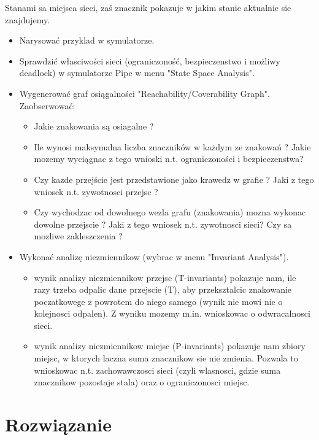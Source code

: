 \documentclass[12pt]{article}
\begin{document}
Stanami sa miejsca sieci, zaś znacznik pokazuje w jakim stanie aktualnie sie znajdujemy.

\begin{itemize}
    \item Narysować przyklad w symulatorze.
    \item Sprawdzić własciwości sieci (ograniczoność, bezpieczenstwo i możliwy deadlock) w symulatorze Pipe w menu "State Space Analysis".

    \item Wygenerować graf osiągalności "Reachability/Coverability Graph". Zaobserwować: 
    \begin{itemize}[label=$-$]
        \item Jakie znakowania są osiagalne ?
        \item Ile wynosi maksymalna liczba znaczników w każdym ze znakowań ? Jakie mozemy wyciągnac z tego wnioski n.t. ograniczoności i bezpieczenstwa?
        \item Czy kazde przejście jest przedstawione jako krawedz w grafie ? Jaki z tego wniosek n.t. zywotnosci przejsc ?
        \item Czy wychodzac od dowolnego wezla grafu (znakowania) mozna wykonac dowolne przejscie ? Jaki z tego wniosek n.t. zywotnosci sieci? Czy sa mozliwe zakleszczenia ?
    \end{itemize}
    \item Wykonać analizę niezmiennikow (wybrac w menu "Invariant Analysis").
    \begin{itemize}[label=$-$]
        \item wynik analizy niezmiennikow przejsc (T-invariants) pokazuje nam, ile razy trzeba odpalic dane przejscie (T), aby przeksztalcic znakowanie poczatkowege z powrotem do niego samego (wynik nie mowi nic o kolejnosci odpalen). Z wyniku mozemy m.in. wnioskowac o odwracalnosci sieci.
        \item wynik analizy niezmiennikow miejsc (P-invariants) pokazuje nam zbiory miejsc, w ktorych laczna suma znacznikow sie nie zmienia. Pozwala to wnioskowac n.t. zachowawczosci sieci (czyli wlasnosci, gdzie suma znacznikow pozostaje stala) oraz o ograniczonosci miejsc.
    \end{itemize}
\end{itemize}

\section{Rozwiązanie}
\end{document}
